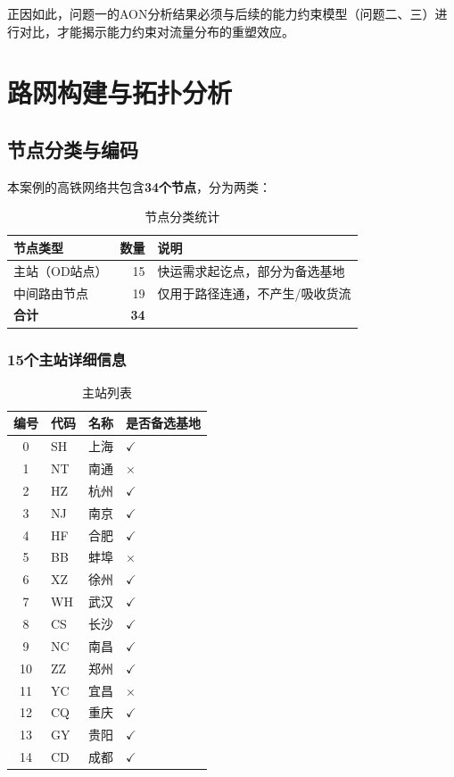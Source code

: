 \documentclass[12pt,a4paper,fontset=none]{ctexart}
\begin{document}
正因如此，问题一的AON分析结果必须与后续的能力约束模型（问题二、三）进行对比，才能揭示能力约束对流量分布的重塑效应。

\section{路网构建与拓扑分析}

\subsection{节点分类与编码}

本案例的高铁网络共包含\textbf{34个节点}，分为两类：

\begin{table}[H]
\centering
\caption{节点分类统计}
\begin{tabular}{lrl}
\toprule
\textbf{节点类型} & \textbf{数量} & \textbf{说明} \\
\midrule
主站（OD站点）  & 15 & 快运需求起讫点，部分为备选基地 \\
中间路由节点  & 19 & 仅用于路径连通，不产生/吸收货流 \\
\midrule
\textbf{合计} & \textbf{34} & \\
\bottomrule
\end{tabular}
\end{table}

\subsubsection*{15个主站详细信息}

\begin{table}[H]
\centering
\caption{主站列表}
\begin{tabular}{clcl}
\toprule
\textbf{编号} & \textbf{代码} & \textbf{名称} & \textbf{是否备选基地} \\
\midrule
 0 & SH  & 上海 & $\checkmark$ \\
 1 & NT  & 南通 & $\times$ \\
 2 & HZ  & 杭州 & $\checkmark$ \\
 3 & NJ  & 南京 & $\checkmark$ \\
 4 & HF  & 合肥 & $\checkmark$ \\
 5 & BB  & 蚌埠 & $\times$ \\
 6 & XZ  & 徐州 & $\checkmark$ \\
 7 & WH  & 武汉 & $\checkmark$ \\
 8 & CS  & 长沙 & $\checkmark$ \\
 9 & NC  & 南昌 & $\checkmark$ \\
10 & ZZ  & 郑州 & $\checkmark$ \\
11 & YC  & 宜昌 & $\times$ \\
12 & CQ  & 重庆 & $\checkmark$ \\
13 & GY  & 贵阳 & $\checkmark$ \\
14 & CD  & 成都 & $\checkmark$ \\
\bottomrule
\end{tabular}
\end{table}
\end{document}
